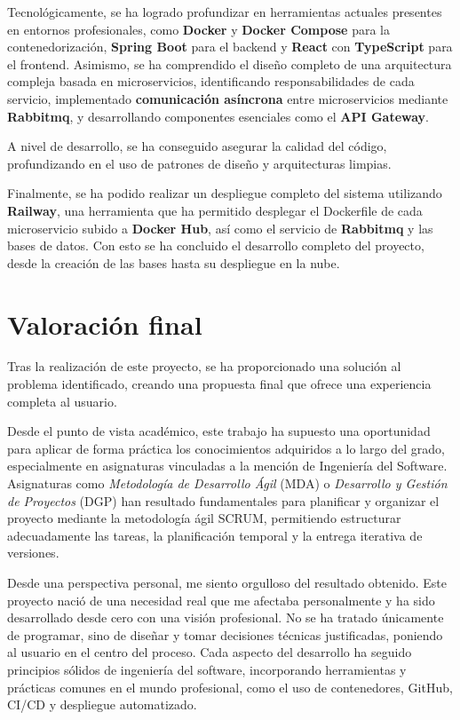 Tecnológicamente, se ha logrado profundizar en herramientas actuales presentes en entornos profesionales, como \textbf{Docker} y \textbf{Docker Compose} para la contenedorización, \textbf{Spring Boot} para el backend y \textbf{React} con \textbf{TypeScript} para el frontend. Asimismo, se ha comprendido el diseño completo de una arquitectura compleja basada en microservicios, identificando responsabilidades de cada servicio, implementado \textbf{comunicación asíncrona} entre microservicios mediante \textbf{Rabbitmq}, y desarrollando componentes esenciales como el \textbf{API Gateway}.

A nivel de desarrollo, se ha conseguido asegurar la calidad del código, profundizando en el uso de patrones de diseño y arquitecturas limpias.

Finalmente, se ha podido realizar un despliegue completo del sistema utilizando \textbf{Railway}, una herramienta que ha permitido desplegar el Dockerfile de cada microservicio subido a \textbf{Docker Hub}, así como el servicio de \textbf{Rabbitmq} y las bases de datos. Con esto se ha concluido el desarrollo completo del proyecto, desde la creación de las bases hasta su despliegue en la nube.

\section{Valoración final}

Tras la realización de este proyecto, se ha proporcionado una solución al problema identificado, creando una propuesta final que ofrece una experiencia completa al usuario.

Desde el punto de vista académico, este trabajo ha supuesto una oportunidad para aplicar de forma práctica los conocimientos adquiridos a lo largo del grado, especialmente en asignaturas vinculadas a la mención de Ingeniería del Software. Asignaturas como \textit{Metodología de Desarrollo Ágil} (MDA) o \textit{Desarrollo y Gestión de Proyectos} (DGP) han resultado fundamentales para planificar y organizar el proyecto mediante la metodología ágil SCRUM, permitiendo estructurar adecuadamente las tareas, la planificación temporal y la entrega iterativa de versiones.

Desde una perspectiva personal, me siento orgulloso del resultado obtenido. Este proyecto nació de una necesidad real que me afectaba personalmente y ha sido desarrollado desde cero con una visión profesional. No se ha tratado únicamente de programar, sino de diseñar y tomar decisiones técnicas justificadas, poniendo al usuario en el centro del proceso. Cada aspecto del desarrollo ha seguido principios sólidos de ingeniería del software, incorporando herramientas y prácticas comunes en el mundo profesional, como el uso de contenedores, GitHub, CI/CD y despliegue automatizado.


